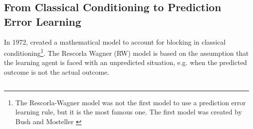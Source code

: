 \subsection{From Classical Conditioning to Prediction Error Learning}
In 1972, \citeauthor{rescorla1972theory} created a mathematical model to account for blocking in classical conditioning\footnote{The Rescorla-Wagner model was not the first model to use a prediction error learning rule, but it is the most famous one. The first model was created by Bush and Mosteller \citep{bush1951mathematical, bush1951model}}\citep{rescorla1972theory}. The Rescorla Wagner (RW) model is based on the assumption that the learning agent is faced with an unpredicted situation, e.g. when the predicted outcome is not the actual outcome. %

\begin{equation}

\end{equation}



